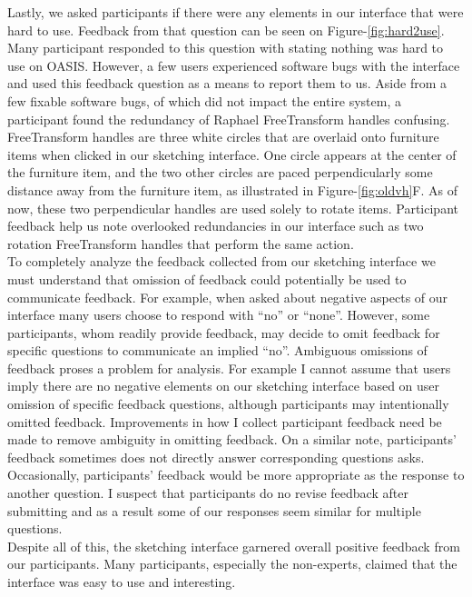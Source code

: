 Lastly, we asked participants if there were any elements in our interface that were hard to use.
Feedback from that question can be seen on Figure-\ref{fig:hard2use}.
Many participant responded to this question with stating nothing was hard to use on OASIS.
However, a few users experienced software bugs with the interface and used this feedback question as a means to report them to us.
Aside from a few fixable software bugs, of which did not impact the entire system, a participant found the redundancy of Raphael FreeTransform handles confusing.
FreeTransform handles are three white circles that are overlaid onto furniture items when clicked in our sketching interface.
One circle appears at the center of the furniture item, and the two other circles are paced perpendicularly some distance away from the furniture item, as illustrated in Figure-\ref{fig:oldvh}F.
As of now, these two perpendicular handles are used solely to rotate items.
Participant feedback help us note overlooked redundancies in our interface such as two rotation FreeTransform handles that perform the same action.\\

To completely analyze the feedback collected from our sketching interface we must understand that omission of feedback could potentially be used to communicate feedback.
For example, when asked about negative aspects of our interface many users choose to respond with ``no'' or ``none''.
However, some participants, whom readily provide feedback, may decide to omit feedback for specific questions to communicate an implied ``no''.
Ambiguous omissions of feedback proses a problem for analysis. 
For example I cannot assume that users imply there are no negative elements on our sketching interface based on user omission of specific feedback questions, although participants may intentionally omitted feedback.
Improvements in how I collect participant feedback need be made to remove ambiguity in omitting feedback.
On a similar note, participants' feedback sometimes does not directly answer corresponding questions asks.
Occasionally, participants' feedback would be more appropriate as the response to another question.
I suspect that participants do no revise feedback after submitting and as a result some of our responses seem similar for multiple questions. \\

Despite all of this, the sketching interface garnered overall positive feedback from our participants.
Many participants, especially the non-experts, claimed that the interface was easy to use and interesting.
 

